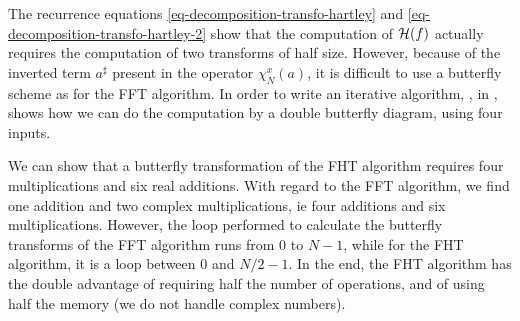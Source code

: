 \begin{rem}
The recurrence equations \eqref{eq-decomposition-transfo-hartley} and \eqref{eq-decomposition-transfo-hartley-2} show that the computation of $ \mathcal{H} (f) $ actually requires the computation of two transforms of half size. However, because of the inverted term $ a^\sharp $ present in the operator $ \chi_N^x (a) $, it is difficult to use a butterfly scheme as for the FFT algorithm. In order to write an iterative algorithm, , in \cite{ullmann}, shows how we can do the computation by a double butterfly diagram, using four inputs.
\end{rem}
We can show that a butterfly transformation of the FHT algorithm requires four multiplications and six real additions. With regard to the FFT algorithm, we find one addition and two complex multiplications, ie four additions and six multiplications. However, the loop performed to calculate the butterfly transforms of the FFT algorithm runs from 0 to $ N-1 $, while for the FHT algorithm, it is a loop between 0 and $ N / 2-1 $. In the end, the FHT algorithm has the double advantage of requiring half the number of operations, and of using half the memory (we do not handle complex numbers).
 
